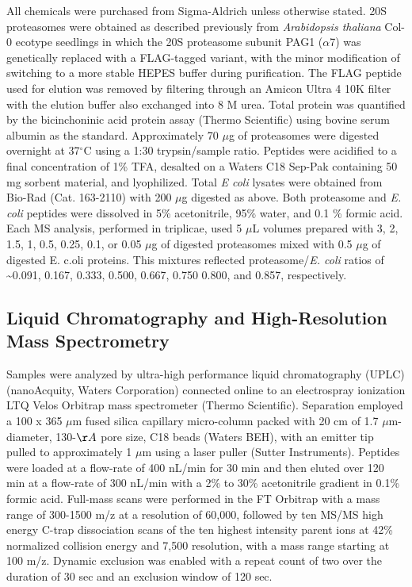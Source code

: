 All chemicals were purchased from Sigma-Aldrich unless otherwise stated.  20S proteasomes were obtained as described previously \citep{book10} from \textit{Arabidopsis thaliana} Col-0 ecotype seedlings in which the 20S proteasome subunit PAG1 ($\alpha$7) was genetically replaced with a FLAG-tagged variant, with the minor modification of switching to a more stable HEPES buffer during purification.  The FLAG peptide used for elution was removed by filtering through an Amicon Ultra 4 10K filter with the elution buffer also exchanged into 8 M urea.  Total protein was quantified by the bicinchoninic acid protein assay (Thermo Scientific) using bovine serum albumin as the standard.  Approximately 70 $\mu$g of proteasomes were digested overnight at 37$^\circ$C using a 1:30 trypsin/sample ratio.  Peptides were acidified to a final concentration of 1\% TFA, desalted on a Waters C18 Sep-Pak containing 50 mg sorbent material, and lyophilized.  Total \textit{E coli} lysates were obtained from Bio-Rad (Cat. 163-2110) with 200 $\mu$g digested as above.  Both proteasome and \textit{E. coli} peptides were dissolved in 5\% acetonitrile, 95\% water, and 0.1 \% formic acid.  Each MS analysis, performed in triplicae, used 5 $\mu$L volumes prepared with 3, 2, 1.5, 1, 0.5, 0.25, 0.1, or 0.05 $\mu$g of digested proteasomes mixed with 0.5 $\mu$g of digested E. c.oli proteins.  This mixtures reflected proteasome/\textit{E. coli} ratios of \textasciitilde0.091, 0.167, 0.333, 0.500, 0.667, 0.750 0.800, and 0.857, respectively.

\subsection{Liquid Chromatography and High-Resolution Mass Spectrometry}

Samples were analyzed by ultra-high performance liquid chromatography (UPLC) (nanoAcquity, Waters Corporation) connected online to an electrospray ionization LTQ Velos Orbitrap mass spectrometer (Thermo Scientific).  Separation employed a 100 x 365 $\mu$m fused silica capillary micro-column packed with 20 cm of 1.7 $\mu$m-diameter, 130-$\AA$ pore size, C18 beads (Waters BEH), with an emitter tip pulled to approximately 1 $\mu$m using a laser puller (Sutter Instruments).  Peptides were loaded at a flow-rate of 400 nL/min for 30 min and then eluted over 120 min at a flow-rate of 300 nL/min with a 2\% to 30\% acetonitrile gradient in 0.1\% formic acid.  Full-mass scans were performed in the FT Orbitrap with a mass range of 300-1500 m/z at a resolution of 60,000, followed by ten MS/MS high energy C-trap dissociation scans of the ten highest intensity parent ions at 42\% normalized collision energy and 7,500 resolution, with a mass range starting at 100 m/z.  Dynamic exclusion was enabled with a repeat count of two over the duration of 30 sec and an exclusion window of 120 sec.  

